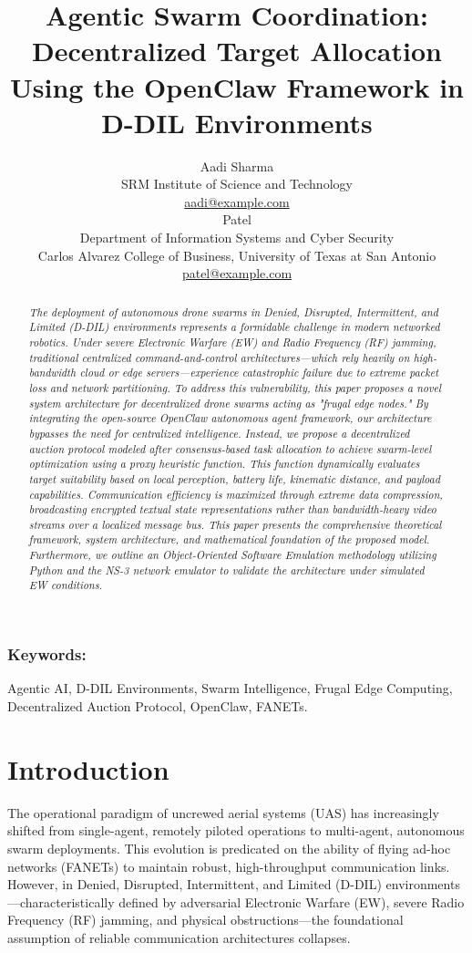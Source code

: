 \documentclass[10pt]{article}
\title{Agentic Swarm Coordination: Decentralized Target Allocation Using the OpenClaw Framework in D-DIL Environments}
\author{Aadi Sharma \\
 SRM Institute of Science and Technology \\
 {\underline{ aadi@example.com}} \\ \And
 [First Name] Patel \\
 Department of Information Systems and Cyber Security \\
 Carlos Alvarez College of Business, University of Texas at San Antonio \\
 {\underline{ patel@example.com} } \\ }
\date{}
\begin{document}
\maketitle

\begin{abstract}
\textit{The deployment of autonomous drone swarms in Denied, Disrupted, Intermittent, and Limited (D-DIL) environments represents a formidable challenge in modern networked robotics. Under severe Electronic Warfare (EW) and Radio Frequency (RF) jamming, traditional centralized command-and-control architectures—which rely heavily on high-bandwidth cloud or edge servers—experience catastrophic failure due to extreme packet loss and network partitioning. To address this vulnerability, this paper proposes a novel system architecture for decentralized drone swarms acting as "frugal edge nodes." By integrating the open-source OpenClaw autonomous agent framework, our architecture bypasses the need for centralized intelligence. Instead, we propose a decentralized auction protocol modeled after consensus-based task allocation to achieve swarm-level optimization using a proxy heuristic function. This function dynamically evaluates target suitability based on local perception, battery life, kinematic distance, and payload capabilities. Communication efficiency is maximized through extreme data compression, broadcasting encrypted textual state representations rather than bandwidth-heavy video streams over a localized message bus. This paper presents the comprehensive theoretical framework, system architecture, and mathematical foundation of the proposed model. Furthermore, we outline an Object-Oriented Software Emulation methodology utilizing Python and the NS-3 network emulator to validate the architecture under simulated EW conditions.}
\end{abstract}

\subsubsection*{Keywords:}
Agentic AI, D-DIL Environments, Swarm Intelligence, Frugal Edge Computing, Decentralized Auction Protocol, OpenClaw, FANETs.

\section{Introduction}

The operational paradigm of uncrewed aerial systems (UAS) has increasingly shifted from single-agent, remotely piloted operations to multi-agent, autonomous swarm deployments. This evolution is predicated on the ability of flying ad-hoc networks (FANETs) to maintain robust, high-throughput communication links. However, in Denied, Disrupted, Intermittent, and Limited (D-DIL) environments—characteristically defined by adversarial Electronic Warfare (EW), severe Radio Frequency (RF) jamming, and physical obstructions—the foundational assumption of reliable communication architectures collapses.
\end{document}
